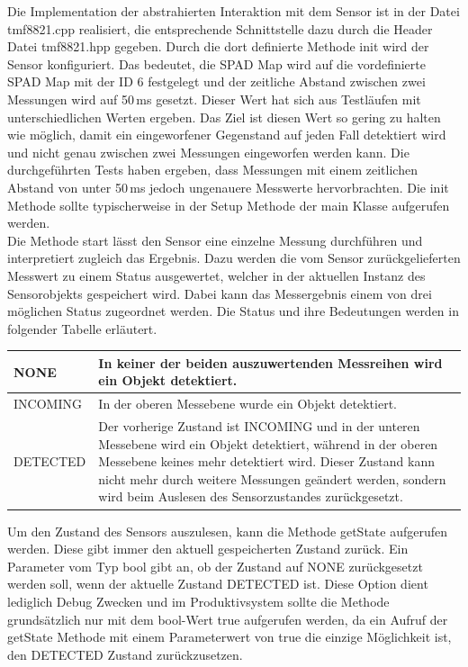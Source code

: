         Die Implementation der abstrahierten Interaktion mit dem Sensor ist in der Datei tmf8821.cpp realisiert, die entsprechende Schnittstelle dazu durch die Header Datei tmf8821.hpp gegeben. Durch die dort definierte Methode init wird der Sensor konfiguriert. Das bedeutet, die SPAD Map wird auf die vordefinierte SPAD Map mit der ID 6 festgelegt und der zeitliche Abstand zwischen zwei Messungen wird auf 50\,ms gesetzt. Dieser Wert hat sich aus Testläufen mit unterschiedlichen Werten ergeben. Das Ziel ist diesen Wert so gering zu halten wie möglich, damit ein eingeworfener Gegenstand auf jeden Fall detektiert wird und nicht genau zwischen zwei Messungen eingeworfen werden kann. Die durchgeführten Tests haben ergeben, dass Messungen mit einem zeitlichen Abstand von unter 50\,ms jedoch ungenauere Messwerte hervorbrachten. Die init Methode sollte typischerweise in der Setup Methode der main Klasse aufgerufen werden.\\

        Die Methode start lässt den Sensor eine einzelne Messung durchführen und interpretiert zugleich das Ergebnis. Dazu werden die vom Sensor zurückgelieferten Messwert zu einem Status ausgewertet, welcher in der aktuellen Instanz des Sensorobjekts gespeichert wird. Dabei kann das Messergebnis einem von drei möglichen Status zugeordnet werden. Die Status und ihre Bedeutungen werden in folgender Tabelle erläutert.\\

        \begin{table}[H]
            \centering
            \begin{tabularx}{\textwidth}{ |l|X| } 
                \hline
                NONE & In keiner der beiden auszuwertenden Messreihen wird ein Objekt detektiert.\\
                \hline
                INCOMING & In der oberen Messebene wurde ein Objekt detektiert. \\
                \hline
                DETECTED & Der vorherige Zustand ist INCOMING und in der unteren Messebene wird ein Objekt detektiert, während in der oberen Messebene keines mehr detektiert wird. Dieser Zustand kann nicht mehr durch weitere Messungen geändert werden, sondern wird beim Auslesen des Sensorzustandes zurückgesetzt.\\
                \hline
            \end{tabularx}
        \end{table}

        Um den Zustand des Sensors auszulesen, kann die Methode getState aufgerufen werden. Diese gibt immer den aktuell gespeicherten Zustand zurück. Ein Parameter vom Typ bool gibt an, ob der Zustand auf NONE zurückgesetzt werden soll, wenn der aktuelle Zustand DETECTED ist. Diese Option dient lediglich Debug Zwecken und im Produktivsystem sollte die Methode grundsätzlich nur mit dem bool-Wert true aufgerufen werden, da ein Aufruf der getState Methode mit einem Parameterwert von true die einzige Möglichkeit ist, den DETECTED Zustand zurückzusetzen.\\
        
